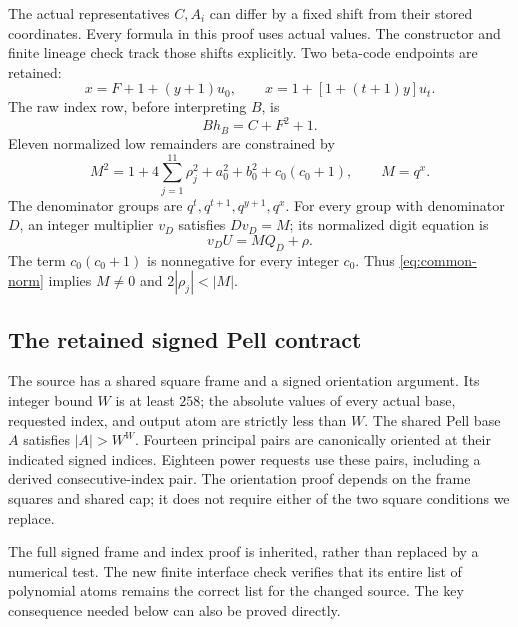 \documentclass[11pt]{article}
\theoremstyle{remark}\newtheorem{remark}[theorem]{Remark}
\begin{document}
The actual representatives $C,A_i$ can differ by a fixed shift from their
stored coordinates. Every formula in this proof uses actual values.
The constructor and finite lineage check track those shifts explicitly.
Two beta-code endpoints are retained:
\begin{equation}\label{eq:endpoints}
 x=F+1+(y+1)u_0,
 \qquad x=1+[1+(t+1)y]u_t.
\end{equation}
The raw index row, before interpreting $B$, is
\begin{equation}\label{eq:rawindex}
 B h_B=C+F^2+1.
\end{equation}
Eleven normalized low remainders are constrained by
\begin{equation}\label{eq:common-norm}
 M^2=1+4\sum_{j=1}^{11}\rho_j^2+a_0^2+b_0^2+c_0(c_0+1),
 \qquad M=q^x.
\end{equation}
The denominator groups are $q^t,q^{t+1},q^{y+1},q^x$.
For every group with denominator $D$, an integer multiplier $v_D$
satisfies $Dv_D=M$; its normalized digit equation is
\begin{equation}\label{eq:normalized}
 v_DU=MQ_D+\rho.
\end{equation}
The term $c_0(c_0+1)$ is nonnegative for every integer $c_0$.
Thus \eqref{eq:common-norm} implies $M\ne0$ and $2|\rho_j|<|M|$.

\subsection{The retained signed Pell contract}

The source has a shared square frame and a signed orientation argument.
Its integer bound $W$ is at least $258$; the absolute values of every
actual base, requested index, and output atom are strictly less than $W$.
The shared Pell base $A$ satisfies $|A|>W^W$. Fourteen principal pairs
are canonically oriented at their indicated signed indices. Eighteen
power requests use these pairs, including a derived consecutive-index
pair. The orientation proof depends on the frame squares and shared
cap; it does not require either of the two square conditions we replace.

The full signed frame and index proof is inherited, rather than replaced
by a numerical test. The new finite interface check verifies that its
entire list of polynomial atoms remains the correct list for the changed
source. The key consequence needed below can also be proved directly.
\end{document}
